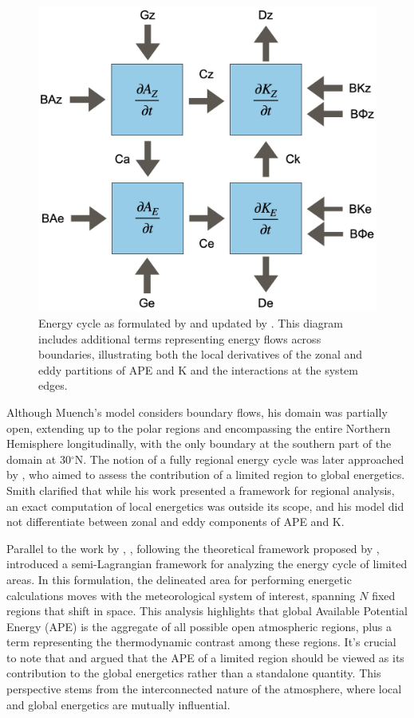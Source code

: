 \begin{figure}[h]
\begin{center}
\setcaptionmargin{1cm}
\includegraphics[width=0.5 \columnwidth,angle=0]{fig/LEC_Muench.png}
\caption[Energy Cycle - Muench]{Energy cycle as formulated by \citet{lorenz1955} and updated by \citet{muench1965dynamics}. This diagram includes additional terms representing energy flows across boundaries, illustrating both the local derivatives of the zonal and eddy partitions of APE and K and the interactions at the system edges.}
\label{LEC_Muench}
\end{center}
\end{figure}

Although Muench's model considers boundary flows, his domain was partially open, extending up to the polar regions and encompassing the entire Northern Hemisphere longitudinally, with the only boundary at the southern part of the domain at 30$^\circ$N. The notion of a fully regional energy cycle was later approached by \citet{smith1969contribution}, who aimed to assess the contribution of a limited region to global energetics. Smith clarified that while his work presented a framework for regional analysis, an exact computation of local energetics was outside its scope, and his model did not differentiate between zonal and eddy components of APE and K.

Parallel to the work by \citet{smith1969contribution}, \citet{johnson1970available}, following the theoretical framework proposed by \citet{dutton1967theory}, introduced a semi-Lagrangian framework for analyzing the energy cycle of limited areas. In this formulation, the delineated area for performing energetic calculations moves with the meteorological system of interest, spanning $N$ fixed regions that shift in space. This analysis highlights that global Available Potential Energy (APE) is the aggregate of all possible open atmospheric regions, plus a term representing the thermodynamic contrast among these regions. It's crucial to note that \citet{smith1969contribution} and \citet{dutton1967theory} argued that the APE of a limited region should be viewed as its contribution to the global energetics rather than a standalone quantity. This perspective stems from the interconnected nature of the atmosphere, where local and global energetics are mutually influential. 

